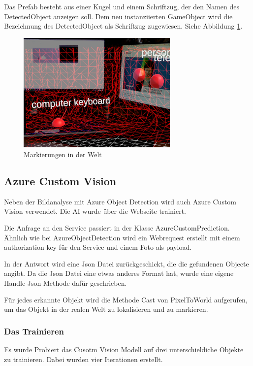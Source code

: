 \documentclass[german,a4paper, 12pt]{llncs}
\begin{document}
Das Prefab besteht aus einer Kugel und einem Schriftzug, der den Namen des DetectedObject anzeigen soll. Dem neu instanziierten GameObject wird die Bezeichnung des DetectedObject als Schriftzug zugewiesen. Siehe Abbildung \ref{image:labels}.

\begin{figure}[H]
	\centering
	\includegraphics[width=0.7\textwidth]{images/ML_labels.jpg}
	\caption[]{Markierungen in der Welt}
	\label{image:labels}
\end{figure}

\subsection{Azure Custom Vision}

Neben der Bildanalyse mit Azure Object Detection wird auch Azure Custom Vision verwendet.
Die AI wurde über die Webseite trainiert.

Die Anfrage an den Service passiert in der Klasse AzureCustomPrediction. Ähnlich wie bei AzureObjectDetection wird ein Webrequest erstellt mit einem authorization key für den Service und einem Foto als payload.

In der Antwort wird eine Json Datei zurückgeschickt, die die gefundenen Objecte angibt.
Da die Json Datei eine etwas anderes Format hat, wurde eine eigene Handle Json Methode dafür geschrieben.

Für jedes erkannte Objekt wird die Methode Cast von PixelToWorld aufgerufen, um das Objekt in der realen Welt zu lokalisieren und zu markieren.

\subsubsection{Das Trainieren}

Es wurde Probiert das Cusotm Vision Modell auf drei unterschieldiche Objekte zu trainieren.
Dabei wurden vier Iterationen erstellt. 
\end{document}
